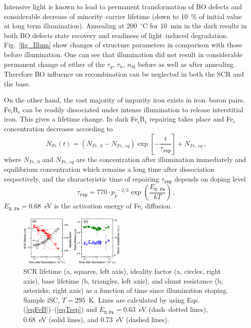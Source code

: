 \documentclass[aip,jap, amsmath,amssymb,reprint]{revtex4-1}
\begin{document}
Intensive light is known\cite{LIDRev,LIDRev2} to lead to permanent transformation of BO defects and considerable decrease of minority--carrier lifetime (down to 10~\% of initial value at long term illumination).
Annealing at 200~$^\circ$C for $10$~min in the dark results in both BO defects state recovery and readiness of light--induced degradation.
Fig.~\ref{fig_Illum} show changes of structure parameters in comparison with those before illumination.
One can see that illumination did not result in considerable permanent change of either of the $\tau_g$, $\tau_n$, $n_{\mathrm{id}}$ before as well as after annealing.
Therefore BO influence on recombination can be neglected  in both the SCR and the base.

On the other hand, the vast majority of impurity iron exists in iron--boron pairs.
Fe$_i$B$_s$ can be readily dissociated under intense illumination to release interstitial iron.
This gives a lifetime change.
In dark Fe$_i$B$_s$ repairing takes place and Fe$_i$ concentration decreases according to \cite{MurphyJAP2011,Wijaranakula}
\begin{equation}
\label{eqFeB}
N_{Fe}(t)=(N_{Fe,\,0}-N_{Fe,\,eq})\exp\left[-\frac{t}{\tau_{\mathtt{rep}}}\right]+N_{Fe,\,eq}\,,
\end{equation}
where
$N_{Fe,\,0}$ and $N_{Fe,\,eq}$ are the concentration after illumination immediately and equilibrium
concentration which remains a long time after dissociation respectively,
and the characteristic time of repairing $\tau_{\mathtt{rep}}$ depends on doping level
\begin{equation}
\label{eqTrep}
\tau_{\mathtt{rep}}=770\cdot p_p^{\,-2/3}\exp\left(\frac{E_{\mathtt{D,\,Fe}}}{kT}\right)\,,
\end{equation}
$E_{\mathtt{D,\,Fe}}=0.68$~eV is the activation energy of Fe$_i$ diffusion.

\begin{figure}
\includegraphics[width=0.47\textwidth]{fig_11ab}%
\caption{\label{fig_Time}
SCR lifetime (a, squares, left axis), ideality factor (a, circles, right axis), base  lifetime (b, triangles, left axis), and shunt resistance (b, asterisks, right axis) as a function of time since illumination stoping.
Sample iSC, $T=295$~K.
Lines are calculated by using Eqs.(\ref{eqFeB})--(\ref{eqTrep}) and $E_{\mathtt{D,Fe}}=0.63$~eV (dash--dotted lines), 0.68~eV (solid lines), and 0.73~eV (dashed lines).
}%
\end{figure}
\end{document}
